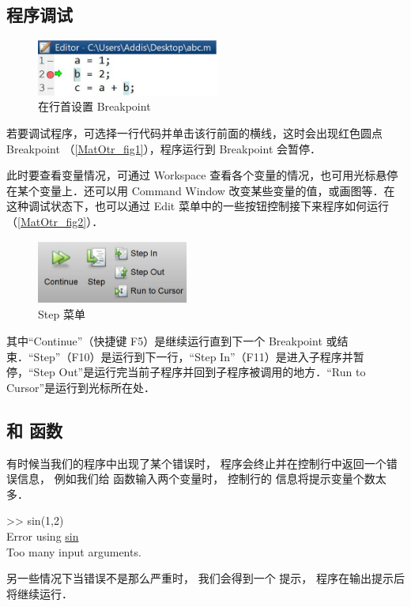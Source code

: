 

\subsection{程序调试}
\begin{figure}[ht]
\centering
\includegraphics[width= 6cm]{./figures/MatOtr1.png}
\caption{在行首设置 Breakpoint}\label{MatOtr_fig1}
\end{figure}

若要调试程序，可选择一行代码并单击该行前面的横线，这时会出现红色圆点 Breakpoint （\autoref{MatOtr_fig1}），程序运行到 Breakpoint 会暂停．

此时要查看变量情况，可通过 Workspace 查看各个变量的情况，也可用光标悬停在某个变量上．还可以用 Command Window 改变某些变量的值，或画图等．在这种调试状态下，也可以通过 Edit 菜单中的一些按钮控制接下来程序如何运行（\autoref{MatOtr_fig2}）．
\begin{figure}[ht]
\centering
\includegraphics[width= 5cm]{./figures/MatOtr2.png}
\caption{Step 菜单}\label{MatOtr_fig2}
\end{figure}
其中“Continue”（快捷键 F5）是继续运行直到下一个 Breakpoint 或结束．“Step”（F10）是运行到下一行，“Step In”（F11）是进入子程序并暂停，“Step Out”是运行完当前子程序并回到子程序被调用的地方．“Run to Cursor”是运行到光标所在处．

\subsection{ 和  函数}
有时候当我们的程序中出现了某个错误时， 程序会终止并在控制行中返回一个错误信息， 例如我们给  函数输入两个变量时， 控制行的  信息将提示变量个数太多．
\begin{Command}
>> sin(1,2)\\
{\color{error}Error using \underline{sin}\\
Too many input arguments.}
\end{Command}
另一些情况下当错误不是那么严重时， 我们会得到一个  提示， 程序在输出提示后将继续运行．

